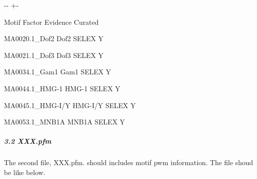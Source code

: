 \documentclass[letterpaper,10pt,english]{sphinxmanual}
\newlength\nbsphinxcodecellspacing
\begin{document}
{
\begin{sphinxVerbatim}[commandchars=\\\{\}]
\llap{\color{nbsphinxin}[52]:\,\hspace{\fboxrule}\hspace{\fboxsep}}   

    
        
         
\end{sphinxVerbatim}
}

{

\kern-\sphinxverbatimsmallskipamount\kern-\baselineskip
\kern+\FrameHeightAdjust\kern-\fboxrule
\vspace{\nbsphinxcodecellspacing}

\begin{sphinxVerbatim}[commandchars=\\\{\}]
Motif   Factor  Evidence        Curated

MA0020.1\_Dof2  Dof2    SELEX   Y

MA0021.1\_Dof3  Dof3    SELEX   Y

MA0034.1\_Gam1  Gam1    SELEX   Y

MA0044.1\_HMG-1 HMG-1   SELEX   Y

MA0045.1\_HMG-I/Y       HMG-I/Y SELEX   Y

MA0053.1\_MNB1A MNB1A   SELEX   Y

\end{sphinxVerbatim}
}


\subparagraph{3.2 XXX.pfm}
\label{\detokenize{notebooks/02_motif_scan/motif_data_preparation/01_How_to_load_motif_data:3.2-XXX.pfm}}
The second file, XXX.pfm. should includes motif pwm information. The file shoud be like below.
\end{document}
